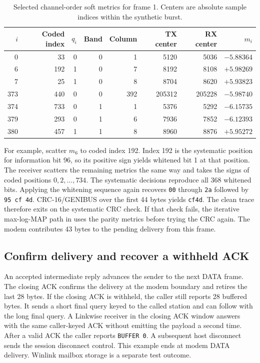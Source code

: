 \begin{table}[htbp]
\centering\small
\begin{tabular}{@{}rrrrrrrr@{}}
\toprule
$i$ & Coded index & $q_i$ & Band & Column & TX center & RX center & $m_i$ \\
\midrule
0   & 33  & 0 & 0 & 1   & 5120   & 5036   & $-5.88364$ \\
6   & 192 & 1 & 0 & 7   & 8192   & 8108   & $+5.98269$ \\
7   & 25  & 1 & 0 & 8   & 8704   & 8620   & $+5.93823$ \\
373 & 440 & 0 & 0 & 392 & 205312 & 205228 & $-5.98740$ \\
374 & 733 & 0 & 1 & 1   & 5376   & 5292   & $-6.15735$ \\
379 & 293 & 0 & 1 & 6   & 7936   & 7852   & $-6.12393$ \\
380 & 457 & 1 & 1 & 8   & 8960   & 8876   & $+5.95272$ \\
\bottomrule
\end{tabular}
\caption{Selected channel-order soft metrics for frame 1. Centers are absolute sample indices within the synthetic burst.}
\label{tab:worked-bw500-metrics}
\end{table}

For example, scatter $m_6$ to coded index 192. Index 192 is the
systematic position for information bit 96, so its positive sign yields
whitened bit 1 at that position. The receiver scatters the remaining
metrics the same way and takes the signs of coded positions
$0,2,\ldots,734$. The systematic decisions reproduce all 368 whitened
bits. Applying the whitening sequence again recovers
\texttt{00} through \texttt{2a} followed by \texttt{95 cf 4d}.
CRC-16/GENIBUS over the first 44 bytes yields \texttt{cf4d}.
The clean trace therefore exits on the systematic CRC check.
If that check fails, the iterative max-log-MAP path in
 uses the parity metrics before trying the CRC again.
The modem contributes 43 bytes to the pending delivery from this frame.

\subsection{Confirm delivery and recover a withheld ACK}

An accepted intermediate reply advances the sender to the next DATA frame.
The closing ACK confirms the delivery at the modem boundary and retires
the last 28 bytes. If the closing ACK is withheld, the caller still reports
28 buffered bytes. It sends a short final query keyed to the called station
and can follow with the long final query. A Linkwise receiver in the closing
ACK window answers with the same caller-keyed ACK without emitting the
payload a second time. After a valid ACK the caller reports \texttt{BUFFER 0}.
A subsequent host disconnect sends the session disconnect control.
This example ends at modem DATA delivery. Winlink mailbox storage is a
separate test outcome.

